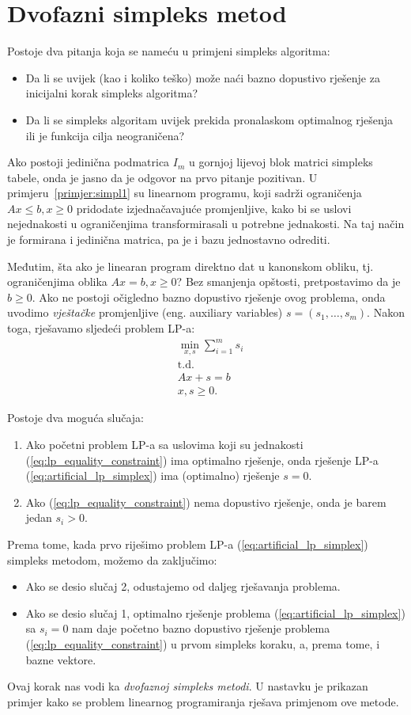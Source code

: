 \documentclass[b5paper, utf8, 11pt, colorlinks]{book}
\theoremstyle{definition}
\begin{document}
\section{Dvofazni simpleks metod}
Postoje dva pitanja koja se nameću u primjeni simpleks algoritma:
\begin{itemize}
	\item Da li se uvijek (kao i koliko teško)   može naći bazno dopustivo rješenje za inicijalni korak 
	simpleks algoritma?
	\item Da li se simpleks algoritam uvijek prekida pronalaskom optimalnog rješenja ili je funkcija cilja neograničena?
\end{itemize}
Ako postoji jedinična podmatrica $I_m$ u gornjoj lijevoj blok matrici simpleks tabele, onda je jasno da je odgovor na prvo pitanje pozitivan. U primjeru~\ref{primjer:simpl1} su linearnom programu, koji sadrži ograničenja $Ax \leq b, x\geq 0$ pridodate izjednačavajuće promjenljive, kako bi se uslovi nejednakosti u ograničenjima transformirasali u potrebne jednakosti.  Na taj način je formirana i jedinična matrica, pa je i bazu jednostavno odrediti.


Međutim, šta ako je linearan program direktno dat u kanonskom obliku, tj. ograničenjima oblika $Ax = b, x \geq 0$? Bez smanjenja opštosti, pretpostavimo da je $b \geq 0$. Ako ne postoji očigledno bazno dopustivo rješenje ovog problema, onda uvodimo \emph{vještačke} promjenljive (eng. auxiliary variables) $s = (s_1,\ldots, s_m)$. Nakon toga, rješavamo sljedeći problem LP-a:
\begin{align}
	& \min_{x,s} \sum_{i=1}^m s_i  \nonumber \\
	& {\mbox{t.d.}}\label{eq:artificial_lp_simplex}\\
	& A x + s = b \nonumber \\
	&  x, s \geq 0. \nonumber
\end{align}

Postoje dva moguća slučaja:
\begin{enumerate}
	\item Ako početni problem LP-a sa uslovima koji su jednakosti (\ref{eq:lp_equality_constraint}) 
	ima optimalno rješenje, onda   rješenje LP-a (\ref{eq:artificial_lp_simplex}) ima (optimalno) rješenje $s = 0$. 
	\item Ako  (\ref{eq:lp_equality_constraint}) nema dopustivo rješenje, onda je barem jedan $s_i > 0$.
\end{enumerate}
Prema tome, kada  prvo riješimo  problem LP-a  (\ref{eq:artificial_lp_simplex}) simpleks metodom, možemo da zaključimo:
\begin{itemize}
	\item Ako se desio slučaj 2, odustajemo od daljeg rješavanja problema.
	\item Ako se desio slučaj 1, optimalno rješenje problema (\ref{eq:artificial_lp_simplex}) sa $s_i=0$ nam daje početno bazno dopustivo rješenje problema (\ref{eq:lp_equality_constraint}) u prvom simpleks koraku, a, prema tome, i bazne vektore. 
\end{itemize} 
Ovaj korak nas vodi ka \emph{dvofaznoj simpleks metodi}. U nastavku je prikazan primjer kako se problem linearnog programiranja rješava primjenom ove metode.      
\end{document}
